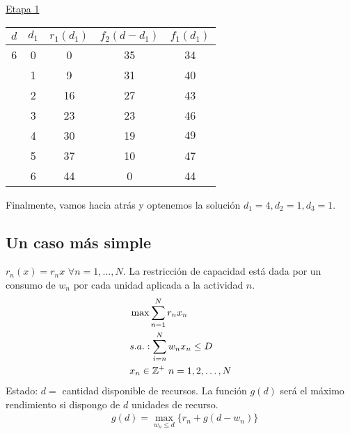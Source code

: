 \documentclass[MIOP.tex]{subfiles}
\begin{document}
\begin{solucion}
\underline{Etapa 1}
\begin{center}
\begin{tabular}{|c|c|c|c|c|}
\hline
$d$ & $d_1$ & $r_1(d_1)$ & $f_2(d-d_1)$ & $f_1(d_1)$\\
\hline
6 & 0 & 0 & 35 & 34\\
  & 1 & 9 & 31 & 40\\
  & 2 & 16 & 27 & 43\\
  & 3 & 23 & 23 & 46\\
  & 4 & 30 & 19 & $\boxed{49}$\\
  & 5 & 37 & 10 & 47\\
  & 6 & 44 & 0 & 44\\
  \hline
\end{tabular}
\end{center}

Finalmente, vamos hacia atrás y optenemos la solución $d_1=4, d_2=1, d_3=1$. 
\end{solucion}

\subsection{Un caso más simple}

$r_n(x)=r_nx$ $\forall n=1,\dots, N$. La restricción de capacidad está dada por un consumo de $w_n$ por cada unidad aplicada a la actividad $n$. 
\begin{align*}
&\max \sum_{n=1}^N r_nx_n\\
&s.a.: \sum_{i=n}^N w_nx_n\leq D\\
&      x_n\in\mathbb{Z}^+\ n=1,2,\dots,N
\end{align*}
Estado: $d=$ cantidad disponible de recursos. La función $g(d)$ será el máximo rendimiento si dispongo de $d$ unidades de recurso. 
\begin{align*}
&g(d)=\max_{w_n\leq d}\{r_n+g(d-w_n)\}
\end{align*}
\end{document}
